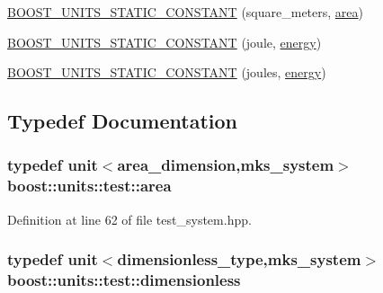 \begin{DoxyCompactItemize}
\item 
\hyperlink{namespaceboost_1_1units_1_1test_af1552f2608b1209cd9d25051112fb879}{B\+O\+O\+S\+T\+\_\+\+U\+N\+I\+T\+S\+\_\+\+S\+T\+A\+T\+I\+C\+\_\+\+C\+O\+N\+S\+T\+A\+NT} (square\+\_\+meters, \hyperlink{namespaceboost_1_1units_1_1test_aefe7b1b4d24a0c81afb2d61774143151}{area})
\item 
\hyperlink{namespaceboost_1_1units_1_1test_abeb88a3c30be2670cd039f5c2b895f5f}{B\+O\+O\+S\+T\+\_\+\+U\+N\+I\+T\+S\+\_\+\+S\+T\+A\+T\+I\+C\+\_\+\+C\+O\+N\+S\+T\+A\+NT} (joule, \hyperlink{namespaceboost_1_1units_1_1test_a5a1d8a7c46b82b43a4f4cd4a0ddcec59}{energy})
\item 
\hyperlink{namespaceboost_1_1units_1_1test_a46d5b207b8516eb3b82cdc8741f8c2e6}{B\+O\+O\+S\+T\+\_\+\+U\+N\+I\+T\+S\+\_\+\+S\+T\+A\+T\+I\+C\+\_\+\+C\+O\+N\+S\+T\+A\+NT} (joules, \hyperlink{namespaceboost_1_1units_1_1test_a5a1d8a7c46b82b43a4f4cd4a0ddcec59}{energy})
\end{DoxyCompactItemize}


\subsection{Typedef Documentation}
\subsubsection[{\texorpdfstring{area}{area}}]{\setlength{\rightskip}{0pt plus 5cm}typedef unit$<${\bf area\+\_\+dimension},{\bf mks\+\_\+system}$>$ {\bf boost\+::units\+::test\+::area}}\hypertarget{namespaceboost_1_1units_1_1test_aefe7b1b4d24a0c81afb2d61774143151}{}\label{namespaceboost_1_1units_1_1test_aefe7b1b4d24a0c81afb2d61774143151}


Definition at line 62 of file test\+\_\+system.\+hpp.

\subsubsection[{\texorpdfstring{dimensionless}{dimensionless}}]{\setlength{\rightskip}{0pt plus 5cm}typedef unit$<$dimensionless\+\_\+type,{\bf mks\+\_\+system}$>$ {\bf boost\+::units\+::test\+::dimensionless}}\hypertarget{namespaceboost_1_1units_1_1test_a926174a372ce3b4577e6c06ccd8b291e}{}\label{namespaceboost_1_1units_1_1test_a926174a372ce3b4577e6c06ccd8b291e}


